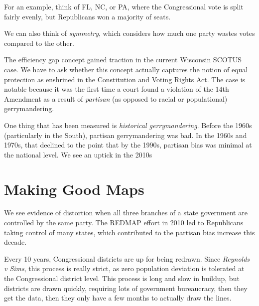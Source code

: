 
For an example, think of FL, NC, or PA, where the Congressional vote is split fairly evenly, but Republicans won a majority of seats.

We can also think of \textit{symmetry}, which considers how much one party wastes votes compared to the other.


The efficiency gap concept gained traction in the current Wisconsin SCOTUS case.  We have to ask whether this concept actually captures the notion of equal protection as enshrined in the Constitution and Voting Rights Act.  The case is notable because it was the first time a court found a violation of the 14th Amendment as a result of \textit{partisan} (as opposed to racial or populational) gerrymandering.

One thing that has been measured is \textit{historical gerrymandering}.  Before the 1960s (particularly in the South), partisan gerrymandering was bad.  In the 1960s and 1970s, that declined to the point that by the 1990s, partisan bias was minimal at the national level.  We see an uptick in the 2010s

\section*{Making Good Maps}

We see evidence of distortion when all three branches of a state government are controlled by the same party.  The REDMAP effort in 2010 led to Republicans taking control of many states, which contributed to the partisan bias increase this decade.

Every 10 years, Congressional districts are up for being redrawn.  Since \textit{Reynolds v Sims}, this process is really strict, as zero population deviation is tolerated at the Congressional district level.  This process is long and slow in buildup, but districts are drawn quickly, requiring lots of government bureaucracy, then they get the data, then they only have a few months to actually draw the lines.

